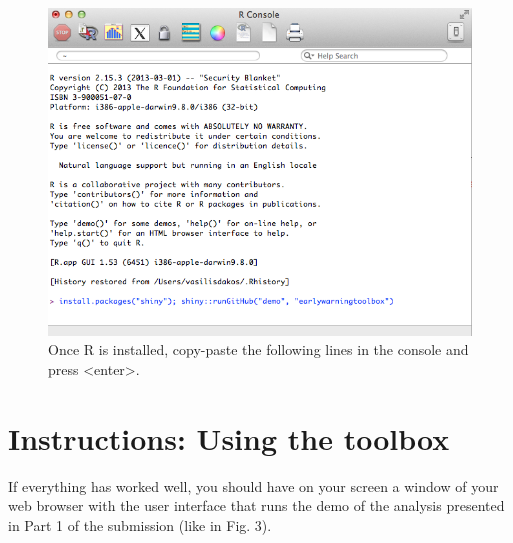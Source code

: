\documentclass[12pt,a4paper,final]{article}
\begin{document}
\begin{doublespacing}
\begin{figure}[ht]
\begin{center}
\includegraphics[scale=0.55]{R_install_ews2.png}
\caption{Once R is installed, copy-paste the following lines in the console and press <enter>.}
\end{center}
\end{figure}

\section{Instructions: Using the toolbox}
If everything has worked well, you should have on your screen a window of your web browser with the user interface that runs the demo of the analysis presented in Part 1 of the submission (like in Fig. 3).%



\end{doublespacing}
\end{document}
